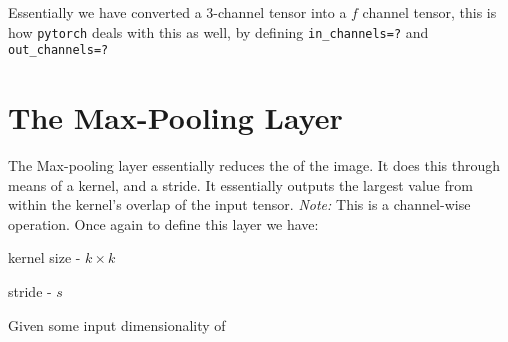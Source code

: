 Essentially we have converted a 3-channel tensor into a $f$ channel tensor, this is how \texttt{pytorch} deals with this as well, by defining \texttt{in\_channels=?} and \texttt{out\_channels=?}

\section{The Max-Pooling Layer}

The Max-pooling layer essentially reduces the  of the image. It does this through means of a kernel, and a stride. It essentially outputs the largest value from within the kernel's overlap of the input tensor. \textit{Note:} This is a channel-wise operation.
Once again to define this layer we have:
\begin{bullets}
	\item kernel size - $k\times k$
	\item stride - $s$
\end{bullets}
Given some input dimensionality of 